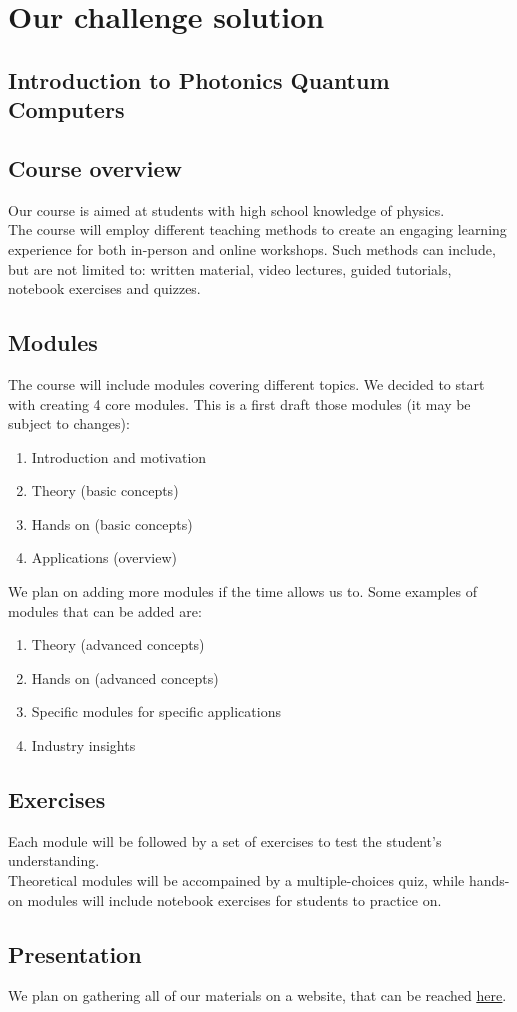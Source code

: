\documentclass[hidelinks, a4paper,12pt]{article}
\begin{document}
\newpage
\section{Our challenge solution}

\subsection*{Introduction to Photonics Quantum Computers}
\subsection{Course overview}
Our course is aimed at students with high school knowledge of physics.\\The course will employ different teaching methods to create an engaging learning experience for both in-person and online workshops. Such methods can include, but are not limited to: written material, video lectures, guided tutorials, notebook exercises and quizzes.
\subsection{Modules}
The course will include modules covering different topics. We decided to start with creating 4 core modules. This is a first draft those modules (it may be subject to changes):
\begin{enumerate}
  \item Introduction and motivation
  \item Theory (basic concepts)
  \item Hands on (basic concepts)
  \item Applications (overview)
\end{enumerate}
We plan on adding more modules if the time allows us to. Some examples of modules that can be added are:
\begin{enumerate}
  \item Theory (advanced concepts)
  \item Hands on (advanced concepts)
  \item Specific modules for specific applications
  \item Industry insights
\end{enumerate}
\subsection{Exercises}
Each module will be followed by a set of exercises to test the student's understanding.\\ Theoretical modules will be accompained by a multiple-choices quiz, while hands-on modules will include notebook exercises for students to practice on.

\subsection{Presentation}
We plan on gathering all of our materials on a website, that can be reached \href{https://cosmcif.github.io/photonics-qworld-challenge/index.html}{\underline{here}}.
\end{document}
